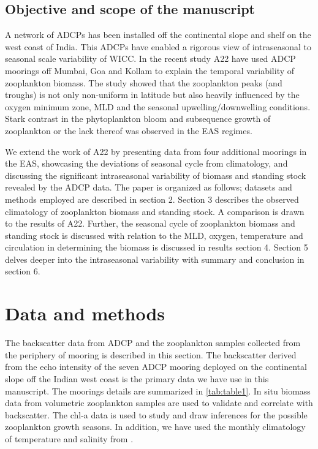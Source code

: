 \documentclass{article}
\begin{document}
	\subsection{Objective and scope of the manuscript}
	
	A network of ADCPs has been installed off the continental slope and shelf on the west coast of India. This ADCPs have enabled a rigorous view of intraseasonal to seasonal scale variability \citep{amol2014observed, chaudhuri2020observed} of WICC. In the recent study A22 have used ADCP moorings off  Mumbai, Goa and Kollam to explain the temporal variability of zooplankton biomass. The study showed that the zooplankton peaks (and troughs) is not only non-uniform in latitude but also heavily influenced by the oxygen minimum zone, MLD and the seasonal upwelling/downwelling conditions. Stark contrast in the phytoplankton bloom and subsequence  growth of zooplankton or the lack thereof was observed in the EAS regimes.
	
    We extend the work of A22 by presenting data from four additional moorings in the EAS, showcasing the deviations of seasonal cycle from climatology, and discussing the significant intraseasonal variability of biomass and standing stock revealed by the ADCP data. The paper is organized as follows; datasets and methods employed are described in section 2. Section 3 describes the observed climatology of zooplankton biomass and standing stock. A comparison is drawn to the results of A22. Further, the seasonal cycle of zooplankton biomass and standing stock is discussed with relation to the MLD, oxygen, temperature and circulation in determining the biomass is discussed in results section 4. Section 5 delves deeper into the intraseasonal variability with summary and conclusion in section 6.
	
	\section{Data and methods}
	The  backscatter data from ADCP and the zooplankton samples collected from the periphery of mooring is described in this section. The backscatter derived from the echo intensity of the seven ADCP mooring deployed on the continental slope off the Indian west coast is the primary data we have use in this manuscript. The moorings details are summarized in \cref{tab:table1}. In situ biomass data from volumetric zooplankton samples are used to validate and correlate with backscatter. The chl-a data is used to study and draw inferences for the possible zooplankton growth seasons. In addition, we have used the monthly climatology of temperature and salinity from \citet{chatterjee2012new}. 
	
\end{document}
